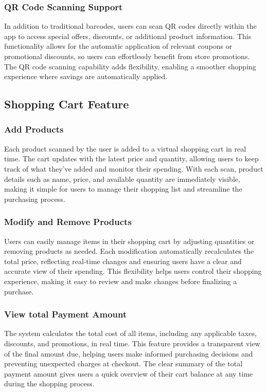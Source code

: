 \documentclass[conference]{IEEEtran}
\begin{document}
\subsubsection{QR Code Scanning Support}
 In addition to traditional barcodes, users can scan QR codes directly within the app to access special offers, discounts, or additional product information. This functionality allows for the automatic application of relevant coupons or promotional discounts, so users can effortlessly benefit from store promotions. The QR code scanning capability adds flexibility, enabling a smoother shopping experience where savings are automatically applied. 
\subsection{Shopping Cart Feature}
\subsubsection{Add Products}
Each product scanned by the user is added to a virtual shopping cart in real time. The cart updates with the latest price and quantity, allowing users to keep track of what they’ve added and monitor their spending. With each scan, product details such as name, price, and available quantity are immediately visible, making it simple for users to manage their shopping list and streamline the purchasing process. 
\subsubsection{Modify and Remove Products}
Users can easily manage items in their shopping cart by adjusting quantities or removing products as needed. Each modification automatically recalculates the total price, reflecting real-time changes and ensuring users have a clear and accurate view of their spending. This flexibility helps users control their shopping experience, making it easy to review and make changes before finalizing a purchase. 
\subsubsection{View total Payment Amount}
The system calculates the total cost of all items, including any applicable taxes, discounts, and promotions, in real time. This feature provides a transparent view of the final amount due, helping users make informed purchasing decisions and preventing unexpected charges at checkout. The clear summary of the total payment amount gives users a quick overview of their cart balance at any time during the shopping process. 
\end{document}

